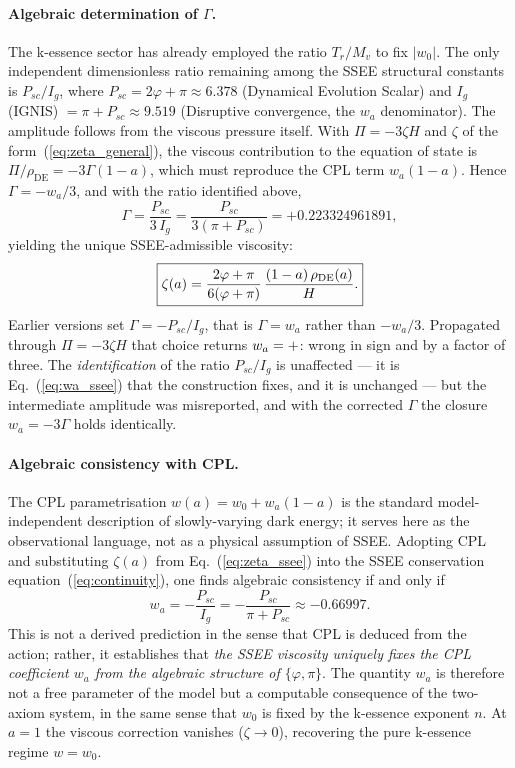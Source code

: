 \paragraph{Algebraic determination of $\Gamma$.}
The k-essence sector has already employed the ratio $T_r/M_v$ to fix
$|w_0|$.  The only independent dimensionless ratio remaining among the
SSEE structural constants is $P_{sc}/I_g$, where
$P_{sc} = 2\varphi+\pi\approx6.378$ (Dynamical Evolution Scalar) and
$I_g$ (IGNIS) $= \pi+P_{sc}\approx9.519$ (Disruptive convergence, the $w_a$ denominator).
The amplitude follows from the viscous pressure itself.  With
$\Pi = -3\zeta H$ and $\zeta$ of the form~(\ref{eq:zeta_general}), the
viscous contribution to the equation of state is $\Pi/\rho_{\mathrm{DE}} =
-3\Gamma(1-a)$, which must reproduce the CPL term $w_a(1-a)$.  Hence
$\Gamma = -w_a/3$, and with the ratio identified above,
%
\begin{equation}
  \Gamma = \frac{P_{sc}}{3\,I_g} = \frac{P_{sc}}{3(\pi+P_{sc})}
         = +0.223324961891,
  \label{eq:Gamma_ssee}
\end{equation}
%
yielding the unique SSEE-admissible viscosity:
%
\begin{equation}
  \boxed{%
    \zeta(a)
      = \frac{2\varphi+\pi}{6(\varphi+\pi)}\,
        \frac{(1-a)\,\rho_{\mathrm{DE}}(a)}{H}.}
  \label{eq:zeta_ssee}
\end{equation}
%
Earlier versions set $\Gamma = -P_{sc}/I_g$, that is $\Gamma = w_a$ rather
than $-w_a/3$.  Propagated through $\Pi = -3\zeta H$ that choice returns
$w_a = +\val{wa_viejo_d6}$: wrong in sign and by a factor of three.  The
\emph{identification} of the ratio $P_{sc}/I_g$ is unaffected --- it is
Eq.~(\ref{eq:wa_ssee}) that the construction fixes, and it is unchanged ---
but the intermediate amplitude was misreported, and with the corrected
$\Gamma$ the closure $w_a = -3\Gamma$ holds identically.

\paragraph{Algebraic consistency with CPL.}
The CPL parametrisation $w(a) = w_0 + w_a(1-a)$ is the standard
model-independent description of slowly-varying dark energy; it serves here as
the observational language, not as a physical assumption of SSEE.  Adopting CPL
and substituting $\zeta(a)$ from Eq.~(\ref{eq:zeta_ssee}) into the SSEE
conservation equation~(\ref{eq:continuity}), one finds algebraic consistency
if and only if
%
\begin{equation}
  \boxed{w_a = -\frac{P_{sc}}{I_g} = -\frac{P_{sc}}{\pi+P_{sc}} \approx -0.66997.}
  \label{eq:wa_ssee}
\end{equation}
%
This is not a derived prediction in the sense that CPL is deduced from the
action; rather, it establishes that \emph{the SSEE viscosity uniquely fixes
the CPL coefficient $w_a$ from the algebraic structure of $\{\varphi,\pi\}$}.
The quantity $w_a$ is therefore not a free parameter of the model but a
computable consequence of the two-axiom system, in the same sense that $w_0$
is fixed by the k-essence exponent $n$.  At $a=1$ the viscous correction
vanishes ($\zeta\to 0$), recovering the pure k-essence regime $w = w_0$.

